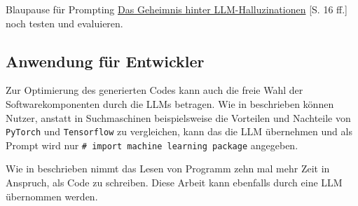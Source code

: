 Blaupause für Prompting \href{https://piamedia.com/wp-content/uploads/2024/09/PIAM_Whitepaper_LLM-Halluzinationen_DE.pdf}{Das Geheimnis hinter LLM-Halluzinationen} [S. 16 ff.] noch testen und evaluieren.

\subsection{Anwendung für Entwickler}
Zur Optimierung des generierten Codes kann auch die freie Wahl der Softwarekomponenten durch die LLMs betragen. Wie in \cite{chen-2021} beschrieben können Nutzer, anstatt in Suchmaschinen beispielsweise die Vorteilen und Nachteile von \texttt{PyTorch} und \texttt{Tensorflow} zu vergleichen, kann das die LLM übernehmen und als Prompt wird nur \texttt{\# import machine learning package} angegeben.\vspace{0.2cm}

Wie in \cite{le-2024} beschrieben nimmt das Lesen von Programm zehn mal mehr Zeit in Anspruch, als Code zu schreiben. Diese Arbeit kann ebenfalls durch eine LLM übernommen werden.
